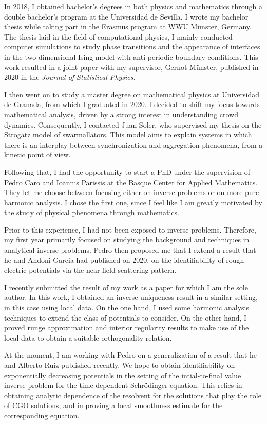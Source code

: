 \documentclass{article}
\begin{document}
In 2018, I obtained bachelor's degrees in both physics and mathematics through a double bachelor's program at the Universidad de Sevilla. I wrote my bachelor thesis while taking part in the Erasmus program at WWU M\"{u}nster, Germany. The thesis laid in the field of computational physics, I mainly conducted computer simulations to study phase transitions and the appearance of interfaces in the two dimensional Ising model with anti-periodic boundary conditions. This work resulted in a joint paper with my supervisor, Gernot M\"unster, published in 2020 in the \textit{Journal of Statistical Physics.}

I then went on to study a master degree on mathematical physics at Universidad de Granada, from which I graduated in 2020. I decided to shift my focus towards mathematical analysis, driven by a strong interest in understanding crowd dynamics.  Consequently, I contacted Juan Soler, who supervised my thesis on the Strogatz model of swarmallators. This model aims to explain systems in which there is an interplay between synchronization and aggregation phenomena, from a kinetic point of view.

Following that, I had the opportunity to start a PhD under the supervision of Pedro Caro and Ioannis Parissis at the Basque Center for Applied Mathematics. They let me choose between focusing either on inverse problems or on more pure harmonic analysis. I chose the first one, since I feel like I am greatly motivated by the study of physical phenomena through mathematics.

Prior to this experience, I had not been exposed to inverse problems. Therefore, my first year primarily focused on studying the background and techniques in analytical inverse problems. Pedro then proposed me that I extend a result that he and Andoni Garcia had published on 2020, on the identifiability of rough electric potentials via the near-field scattering pattern. 

I recently submitted the result of my work as a paper for which I am the sole author. In this work, I obtained an inverse uniqueness result in a similar setting, in this case using local data. On the one hand, I used some harmonic analysis techniques to extend the class of potentials to consider. On the other hand, I proved runge approximation and interior regularity results to make use of the local data to obtain a suitable orthogonality relation.

At the moment, I am working with Pedro on a generalization of a result that he and Alberto Ruiz published recently. We hope to obtain identifiability on exponentially decreasing potentials in the setting of the intial-to-final value inverse problem for the time-dependent Schr\"odinger equation. This relies in obtaining analytic dependence of the resolvent for the solutions that play the role of CGO solutions, and in proving a local smoothness estimate for the corresponding equation.
\end{document}
